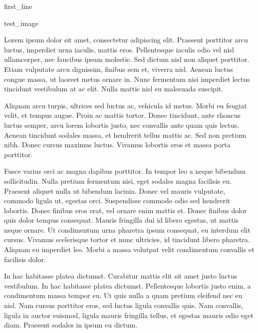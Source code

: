 \documentclass[
	a4paper, %
	10pt, %
]{CSMinimalMemo}
\begin{document}
\outputheader %


{{ first_line }}

\begin{center}
	{{ test_image }}
\end{center}

Lorem ipsum dolor sit amet, consectetur adipiscing elit. Praesent porttitor arcu luctus, imperdiet urna iaculis, mattis eros. Pellentesque iaculis odio vel nisl ullamcorper, nec faucibus ipsum molestie. Sed dictum nisl non aliquet porttitor. Etiam vulputate arcu dignissim, finibus sem et, viverra nisl. Aenean luctus congue massa, ut laoreet metus ornare in. Nunc fermentum nisi imperdiet lectus tincidunt vestibulum at ac elit. Nulla mattis nisl eu malesuada suscipit.

Aliquam arcu turpis, ultrices sed luctus ac, vehicula id metus. Morbi eu feugiat velit, et tempus augue. Proin ac mattis tortor. Donec tincidunt, ante rhoncus luctus semper, arcu lorem lobortis justo, nec convallis ante quam quis lectus. Aenean tincidunt sodales massa, et hendrerit tellus mattis ac. Sed non pretium nibh. Donec cursus maximus luctus. Vivamus lobortis eros et massa porta porttitor.

Fusce varius orci ac magna dapibus porttitor. In tempor leo a neque bibendum sollicitudin. Nulla pretium fermentum nisi, eget sodales magna facilisis eu. Praesent aliquet nulla ut bibendum lacinia. Donec vel mauris vulputate, commodo ligula ut, egestas orci. Suspendisse commodo odio sed hendrerit lobortis. Donec finibus eros erat, vel ornare enim mattis et. Donec finibus dolor quis dolor tempus consequat. Mauris fringilla dui id libero egestas, ut mattis neque ornare. Ut condimentum urna pharetra ipsum consequat, eu interdum elit cursus. Vivamus scelerisque tortor et nunc ultricies, id tincidunt libero pharetra. Aliquam eu imperdiet leo. Morbi a massa volutpat velit condimentum convallis et facilisis dolor.

In hac habitasse platea dictumst. Curabitur mattis elit sit amet justo luctus vestibulum. In hac habitasse platea dictumst. Pellentesque lobortis justo enim, a condimentum massa tempor eu. Ut quis nulla a quam pretium eleifend nec eu nisl. Nam cursus porttitor eros, sed luctus ligula convallis quis. Nam convallis, ligula in auctor euismod, ligula mauris fringilla tellus, et egestas mauris odio eget diam. Praesent sodales in ipsum eu dictum.
\end{document}
